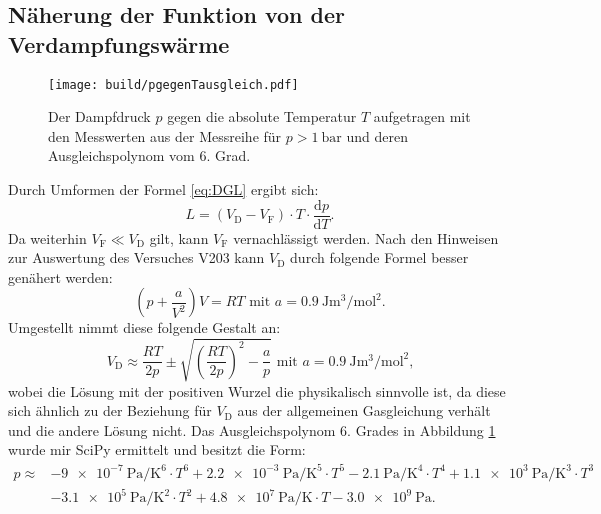 \subsection{Näherung der Funktion von der Verdampfungswärme}

\begin{figure}
\centering
\caption{Der Dampfdruck $p$ gegen die absolute Temperatur $T$ aufgetragen mit den Messwerten aus der Messreihe für $p>\SI{1}{\bar}$ und deren Ausgleichspolynom vom 6. Grad.}
\texttt{[image: build/pgegenTausgleich.pdf]}
\label{fig:Graph3}
\end{figure}
Durch Umformen der Formel \eqref{eq:DGL} ergibt sich:
\begin{equation}
	L=(V_\text{D}-V_\text{F})\cdot T\cdot \frac{\text{d} p}{\text{d} T}\text{.}\label{eq:L}
\end{equation}
Da weiterhin $V_\text{F}\ll V_\text{D}$ gilt, kann $V_\text{F}$ vernachlässigt werden. Nach den Hinweisen zur Auswertung des Versuches V203 \cite{V203} kann $V_\text{D}$ durch folgende Formel besser genähert werden:
\begin{equation}
	\left( p + \frac{a}{V^2}\right) V = R T \text{   mit }a=\SI{0.9}{\joule\meter\tothe{3}\per\mol\squared}\text{.}
\end{equation}
Umgestellt nimmt diese folgende Gestalt an:
\begin{equation}
	V_\text{D} \approx \frac{R T}{2p} \pm \sqrt{\left(\frac{R T}{2p}\right)^2-\frac{a}{p}}\text{   mit }a=\SI{0.9}{\joule\meter\tothe{3}\per\mol\squared}\label{eq:VD}\text{,}
\end{equation}
wobei die Lösung mit der positiven Wurzel die physikalisch sinnvolle ist, da diese sich ähnlich zu der Beziehung für $V_\text{D}$ aus der allgemeinen Gasgleichung verhält und die andere Lösung nicht.
Das Ausgleichspolynom 6. Grades in Abbildung \ref{fig:Graph3} wurde mir SciPy \cite{scipy} ermittelt und besitzt die Form:
\begin{equation}
\begin{aligned}
p \approx &- \SI{9e-7}{\pascal\per\kelvin\tothe{6}} \cdot T^6 + \SI{2.2e-3}{\pascal\per\kelvin\tothe{5}} \cdot T^5 - \SI{2.1}{\pascal\per\kelvin\tothe{4}}\cdot T^4 + \SI{1.1e3}{\pascal\per\kelvin\tothe{3}} \cdot T^3 \\
&- \SI{3.1e5}{\pascal\per\kelvin\tothe{2}} \cdot T^2 + \SI{4.8e7}{\pascal\per\kelvin} \cdot T - \SI{3.0e9}{\pascal}\text{.}
\end{aligned}\label{eq:p}
\end{equation}
